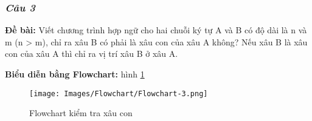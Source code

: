 \subsubsection{\textit{Câu 3}}

\noindent\textbf{\large Đề bài:} Viết chương trình hợp ngữ cho hai chuỗi ký tự A và B có độ dài là n và m (n > m), chỉ ra xâu B có phải là xâu con của xâu A không? Nếu xâu B là xâu con của xâu A thì chỉ ra vị trí xâu B ở xâu A.

\vspace{0.5cm}
\noindent\textbf{\large Biểu diễn bằng Flowchart:} hình \ref{fig:flowchart-3}

\begin{figure}[H]
    \centering
    \texttt{[image: Images/Flowchart/Flowchart-3.png]}
    \caption{Flowchart kiểm tra xâu con}
    \label{fig:flowchart-3}
\end{figure}

